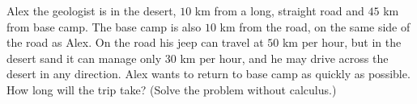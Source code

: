 Alex the geologist is in the desert, $10$ km from a long, straight road and $45$ km from base camp. The base camp is also $10$ km from the road, on the same side of the road as Alex. On the road his jeep can travel at $50$ km per hour, but in the desert sand it can manage only $30$ km per hour, and he may drive across the desert in any direction. Alex wants to return to base camp as quickly as possible. How long will the trip take? (Solve the problem without calculus.)
